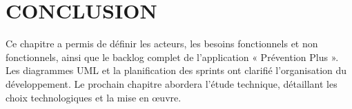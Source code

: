 \section*{CONCLUSION}

\noindent Ce chapitre a permis de définir les acteurs, les besoins fonctionnels et non fonctionnels, ainsi que le backlog complet de l'application « Prévention Plus ». Les diagrammes UML et la planification des sprints ont clarifié l'organisation du développement. Le prochain chapitre abordera l'étude technique, détaillant les choix technologiques et la mise en œuvre.